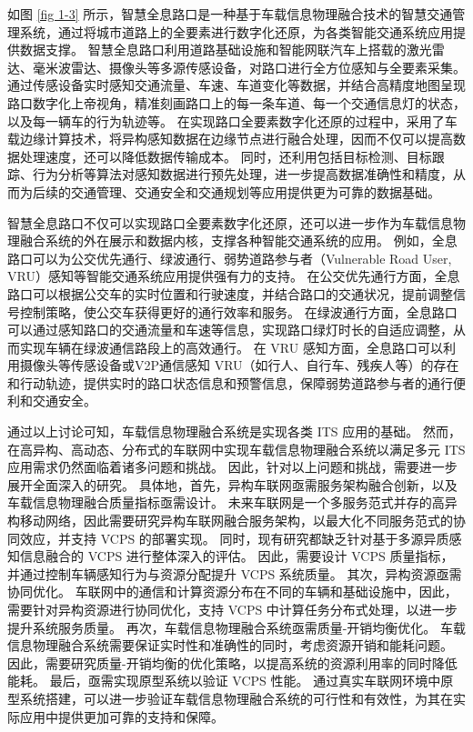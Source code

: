 如图 \ref{fig 1-3} 所示，智慧全息路口是一种基于车载信息物理融合技术的智慧交通管理系统，通过将城市道路上的全要素进行数字化还原，为各类智能交通系统应用提供数据支撑。
智慧全息路口利用道路基础设施和智能网联汽车上搭载的激光雷达、毫米波雷达、摄像头等多源传感设备，对路口进行全方位感知与全要素采集。
通过传感设备实时感知交通流量、车速、车道变化等数据，并结合高精度地图呈现路口数字化上帝视角，精准刻画路口上的每一条车道、每一个交通信息灯的状态，以及每一辆车的行为轨迹等。
在实现路口全要素数字化还原的过程中，采用了车载边缘计算技术，将异构感知数据在边缘节点进行融合处理，因而不仅可以提高数据处理速度，还可以降低数据传输成本。
同时，还利用包括目标检测、目标跟踪、行为分析等算法对感知数据进行预先处理，进一步提高数据准确性和精度，从而为后续的交通管理、交通安全和交通规划等应用提供更为可靠的数据基础。

智慧全息路口不仅可以实现路口全要素数字化还原，还可以进一步作为车载信息物理融合系统的外在展示和数据内核，支撑各种智能交通系统的应用。
例如，全息路口可以为公交优先通行、绿波通行、弱势道路参与者（Vulnerable Road User, VRU）感知等智能交通系统应用提供强有力的支持。
在公交优先通行方面，全息路口可以根据公交车的实时位置和行驶速度，并结合路口的交通状况，提前调整信号控制策略，使公交车获得更好的通行效率和服务。
在绿波通行方面，全息路口可以通过感知路口的交通流量和车速等信息，实现路口绿灯时长的自适应调整，从而实现车辆在绿波通信路段上的高效通行。
在 VRU 感知方面，全息路口可以利用摄像头等传感设备或V2P通信感知 VRU（如行人、自行车、残疾人等）的存在和行动轨迹，提供实时的路口状态信息和预警信息，保障弱势道路参与者的通行便利和交通安全。

通过以上讨论可知，车载信息物理融合系统是实现各类 ITS 应用的基础。
然而，在高异构、高动态、分布式的车联网中实现车载信息物理融合系统以满足多元 ITS 应用需求仍然面临着诸多问题和挑战。
因此，针对以上问题和挑战，需要进一步展开全面深入的研究。
具体地，首先，异构车联网亟需服务架构融合创新，以及车载信息物理融合质量指标亟需设计。
未来车联网是一个多服务范式并存的高异构移动网络，因此需要研究异构车联网融合服务架构，以最大化不同服务范式的协同效应，并支持 VCPS 的部署实现。
同时，现有研究都缺乏针对基于多源异质感知信息融合的 VCPS 进行整体深入的评估。
因此，需要设计 VCPS 质量指标，并通过控制车辆感知行为与资源分配提升 VCPS 系统质量。
其次，异构资源亟需协同优化。
车联网中的通信和计算资源分布在不同的车辆和基础设施中，因此，需要针对异构资源进行协同优化，支持 VCPS 中计算任务分布式处理，以进一步提升系统服务质量。
再次，车载信息物理融合系统亟需质量-开销均衡优化。
车载信息物理融合系统需要保证实时性和准确性的同时，考虑资源开销和能耗问题。
因此，需要研究质量-开销均衡的优化策略，以提高系统的资源利用率的同时降低能耗。
最后，亟需实现原型系统以验证 VCPS 性能。
通过真实车联网环境中原型系统搭建，可以进一步验证车载信息物理融合系统的可行性和有效性，为其在实际应用中提供更加可靠的支持和保障。

